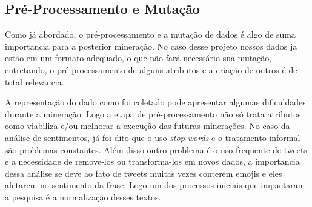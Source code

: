 \subsection{Pré-Processamento e Mutação}
Como já abordado, o pré-processamento e a mutação de dados é algo de suma importancia para a posterior mineração. No caso desse projeto nossos dados ja estão em um formato adequado, o que não fará necessário sua mutação, entretando, o pré-processamento de alguns atributos e a criação de outros é de total relevancia.

A representação do dado como foi coletado pode apresentar algumas dificuldades durante a mineração. Logo a etapa de pré-processamento não só trata atributos como viabiliza e/ou melhorar a execução das futuras minerações. No caso da análise de sentimentos, já foi dito que o uso \textit{stop-words} e o tratamento informal são problemas constantes. Além disso outro problema é o uso frequente de tweets e a necessidade de remove-los ou transforma-los em novos dados, a importancia dessa análise se deve ao fato de tweets muitas vezes conterem emojis e eles afetarem no sentimento da frase\cite{novak2015sentiment}. Logo um dos processos iniciais que impactaram a pesquisa é a normalização desses textos.

